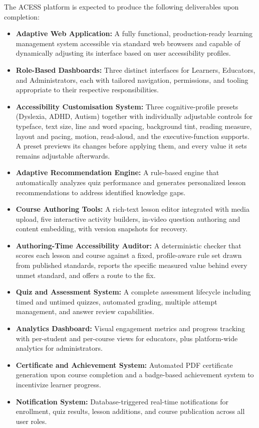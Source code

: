 \documentclass[12pt, oneside]{article} %
\begin{document}
The ACESS platform is expected to produce the following deliverables upon completion:

\begin{itemize}
    \item \textbf{Adaptive Web Application:} A fully functional, production-ready learning management system accessible via standard web browsers and capable of dynamically adjusting its interface based on user accessibility profiles.
    \item \textbf{Role-Based Dashboards:} Three distinct interfaces for Learners, Educators, and Administrators, each with tailored navigation, permissions, and tooling appropriate to their respective responsibilities.
    \item \textbf{Accessibility Customisation System:} Three cognitive-profile presets (Dyslexia, ADHD, Autism) together with individually adjustable controls for typeface, text size, line and word spacing, background tint, reading measure, layout and pacing, motion, read-aloud, and the executive-function supports. A preset previews its changes before applying them, and every value it sets remains adjustable afterwards.
    \item \textbf{Adaptive Recommendation Engine:} A rule-based engine that automatically analyzes quiz performance and generates personalized lesson recommendations to address identified knowledge gaps.
    \item \textbf{Course Authoring Tools:} A rich-text lesson editor integrated with media upload, five interactive activity builders, in-video question authoring and content embedding, with version snapshots for recovery.
    \item \textbf{Authoring-Time Accessibility Auditor:} A deterministic checker that scores each lesson and course against a fixed, profile-aware rule set drawn from published standards, reports the specific measured value behind every unmet standard, and offers a route to the fix.
    \item \textbf{Quiz and Assessment System:} A complete assessment lifecycle including timed and untimed quizzes, automated grading, multiple attempt management, and answer review capabilities.
    \item \textbf{Analytics Dashboard:} Visual engagement metrics and progress tracking with per-student and per-course views for educators, plus platform-wide analytics for administrators.
    \item \textbf{Certificate and Achievement System:} Automated PDF certificate generation upon course completion and a badge-based achievement system to incentivize learner progress.
    \item \textbf{Notification System:} Database-triggered real-time notifications for enrollment, quiz results, lesson additions, and course publication across all user roles.
\end{itemize}
\end{document}
